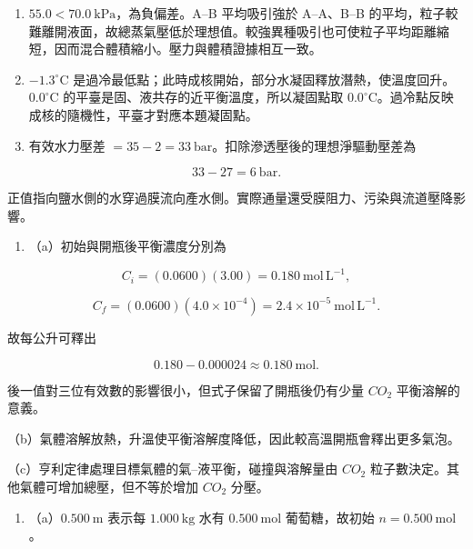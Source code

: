 \documentclass[11pt,a4paper]{article}
\providecommand{\tightlist}{%
  \setlength{\itemsep}{0pt}\setlength{\parskip}{0pt}}
\begin{document}
\begin{enumerate}
  \[
  P_A=(0.250)(240)=60.0\ \mathrm{mmHg},
  \]

  \[
  P_B=(0.750)(60.0)=45.0\ \mathrm{mmHg}.
  \]

  \[
  P_{total}=105.0\ \mathrm{mmHg},\qquad y_A=60.0/105.0=0.571.
  \]

  \(y_A=0.571>X_A=0.250\)，蒸氣富含純物質蒸氣壓較大的 A。
\item
  \(55.0<70.0\ \mathrm{kPa}\)，為負偏差。A--B 平均吸引強於 A--A、B--B 的平均，粒子較難離開液面，故總蒸氣壓低於理想值。較強異種吸引也可使粒子平均距離縮短，因而混合體積縮小。壓力與體積證據相互一致。
\item
  \(-1.3^\circ\mathrm C\) 是過冷最低點；此時成核開始，部分水凝固釋放潛熱，使溫度回升。\(0.0^\circ\mathrm C\) 的平臺是固、液共存的近平衡溫度，所以凝固點取 \(0.0^\circ\mathrm C\)。過冷點反映成核的隨機性，平臺才對應本題凝固點。
\item
  有效水力壓差 \(=35-2=33\ \mathrm{bar}\)。扣除滲透壓後的理想淨驅動壓差為
\end{enumerate}

\[
   33-27=6\ \mathrm{bar}.
   \]

正值指向鹽水側的水穿過膜流向產水側。實際通量還受膜阻力、污染與流道壓降影響。

\begin{enumerate}
\def\labelenumi{\arabic{enumi}.}
\setcounter{enumi}{12}
\tightlist
\item
  （a）初始與開瓶後平衡濃度分別為
\end{enumerate}

\[
   C_i=(0.0600)(3.00)=0.180\ \mathrm{mol\,L^{-1}},
   \]

\[
   C_f=(0.0600)(4.0\times10^{-4})=2.4\times10^{-5}\ \mathrm{mol\,L^{-1}}.
   \]

故每公升可釋出

\[
   0.180-0.000024\approx0.180\ \mathrm{mol}.
   \]

後一值對三位有效數的影響很小，但式子保留了開瓶後仍有少量 \(CO_2\) 平衡溶解的意義。

（b）氣體溶解放熱，升溫使平衡溶解度降低，因此較高溫開瓶會釋出更多氣泡。

（c）亨利定律處理目標氣體的氣--液平衡，碰撞與溶解量由 \(CO_2\) 粒子數決定。其他氣體可增加總壓，但不等於增加 \(CO_2\) 分壓。

\begin{enumerate}
\def\labelenumi{\arabic{enumi}.}
\setcounter{enumi}{13}
\tightlist
\item
  （a）\(0.500\ \mathrm m\) 表示每 \(1.000\ \mathrm{kg}\) 水有 \(0.500\ \mathrm{mol}\) 葡萄糖，故初始 \(n=0.500\ \mathrm{mol}\)。
\end{enumerate}
\end{document}
